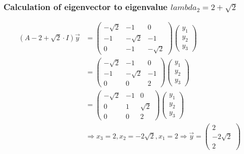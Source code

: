 \subsubsection*{Calculation of eigenvector to eigenvalue $lambda_{2}=2+\sqrt{2}$}
\begin{align*}
(A-2+\sqrt{2}\cdot I)\overrightarrow{y}	&=\begin{pmatrix}
									-\sqrt{2}	&	-1	&	0\\
									-1	&	-\sqrt{2}	&	-1\\
									0	&	-1	&	-\sqrt{2}
								  \end{pmatrix} \begin{pmatrix}
									y_{1}\\
									y_{2}\\
									y_{3}
							 	  \end{pmatrix}\\
								&=\begin{pmatrix}
								  -\sqrt{2}	&	-1	&	0\\
									-1	&	-\sqrt{2}	&	-1\\
									0	&	0	&	2
								  \end{pmatrix} \begin{pmatrix}
									y_{1}\\
									y_{2}\\
									y_{3}
								  \end{pmatrix}\\
								&=\begin{pmatrix}
								  -\sqrt{2}	&	-1	&	0\\
									0	&	1	&	\sqrt{2}\\
									0	&	0	&	2
								  \end{pmatrix} \begin{pmatrix}
								    y_{1}\\
									y_{2}\\
									y_{3}
								  \end{pmatrix}\\
								&\Rightarrow x_{3}=2,x_{2}=-2\sqrt{2},x_{1}=2\Rightarrow\overrightarrow{y}=\begin{pmatrix}
								  2\\-2\sqrt{2}\\2
								  \end{pmatrix}
\end{align*}

